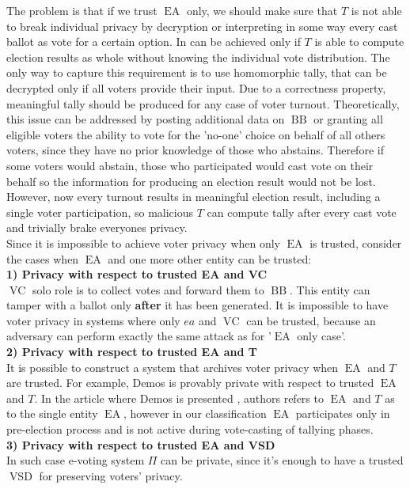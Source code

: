 \documentclass[12pt]{article}
\DeclareMathOperator{\vsd}{VSD}
\DeclareMathOperator{\ea}{EA}
\DeclareMathOperator{\bb}{BB}
\DeclareMathOperator{\voc}{VC}
\begin{document}
The problem is that if we trust $\ea$ only, we should make sure that $T$ is not able to break individual privacy by decryption or interpreting in some way every cast ballot as vote for a certain option. In can be achieved only if $T$ is able to compute election results as whole without knowing the individual vote distribution. The only way to capture this requirement is to use homomorphic tally, that can be decrypted only if all voters provide their input. Due to a correctness property, meaningful tally should be produced for any case of voter turnout. Theoretically, this issue can be addressed by posting additional data on $\bb$ or granting all eligible voters the ability to vote for the 'no-one' choice on behalf of all others voters, since they have no prior knowledge of those who abstains. Therefore if some voters would abstain, those who participated would cast vote on  their behalf so the information for producing an election result would not be lost. However, now every turnout results in meaningful election result, including a single voter participation, so malicious  $T$ can compute tally after every cast vote and trivially brake everyones privacy. \\

Since it is impossible to achieve voter privacy when only $\ea$ is trusted, consider the cases when $\ea$ and one more other entity can be trusted: \\
\textbf{1) Privacy with respect to trusted EA and VC}\\
 $\voc$ solo role is to collect votes and forward them to $\bb$. This entity can tamper with a ballot only \textbf{after} it has been generated. It is impossible to have voter privacy in systems where only $ea$ and $\voc$ can be trusted, because an adversary can perform exactly the same attack as for '$\ea$ only case'.\\
\textbf{2) Privacy with respect to trusted EA and T}\\
It is possible to construct a system that  archives voter privacy when $\ea$ and $T$ are trusted. For example, Demos is provably private with respect to trusted $\ea$ and $T$. In the article  where Demos is presented \cite{Kiayias2015a}, authors refers to $\ea$ and $T$ as to the single entity $\ea$, however in our classification $\ea$ participates only in pre-election process and is not active during vote-casting of tallying phases. \\
\textbf{3) Privacy with respect to trusted EA and VSD}\\
 In such case e-voting  system $\Pi$ can be private, since it's enough to have a trusted $\vsd$ for preserving voters' privacy.
\end{document}
